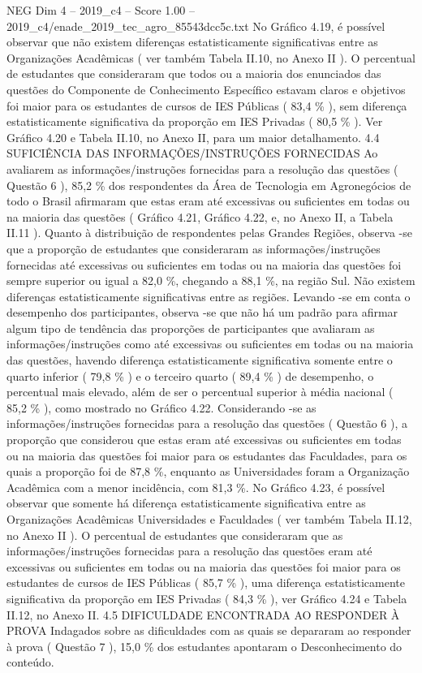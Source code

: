 \begin{textsample}{NEG Dim 4 – 2019\_c4 – Score 1.00 – 2019\_c4/enade\_2019\_tec\_agro\_85543dcc5c.txt}
No Gráfico 4.19, é possível observar que não existem diferenças estatisticamente significativas entre as Organizações Acadêmicas ( ver também Tabela II.10, no Anexo II ).
O percentual de estudantes que consideraram que todos ou a maioria dos enunciados das questões do Componente de Conhecimento Específico estavam claros e objetivos foi maior para os estudantes de cursos de IES Públicas ( 83,4 \% ), sem diferença estatisticamente significativa da proporção em IES Privadas ( 80,5 \% ).
Ver Gráfico 4.20 e Tabela II.10, no Anexo II, para um maior detalhamento. 4.4 SUFICIÊNCIA DAS INFORMAÇÕES/INSTRUÇÕES FORNECIDAS Ao avaliarem as informações/instruções fornecidas para a resolução das questões ( Questão 6 ), 85,2 \% dos respondentes da Área de Tecnologia em Agronegócios de todo o Brasil afirmaram que estas eram até excessivas ou suficientes em todas ou na maioria das questões ( Gráfico 4.21, Gráfico 4.22, e, no Anexo II, a Tabela II.11 ).
Quanto à distribuição de respondentes pelas Grandes Regiões, observa -se que a proporção de estudantes que consideraram as informações/instruções fornecidas até excessivas ou suficientes em todas ou na maioria das questões foi sempre superior ou igual a 82,0 \%, chegando a 88,1 \%, na região Sul.
Não existem diferenças estatisticamente significativas entre as regiões.
Levando -se em conta o desempenho dos participantes, observa -se que não há um padrão para afirmar algum tipo de tendência das proporções de participantes que avaliaram as informações/instruções como até excessivas ou suficientes em todas ou na maioria das questões, havendo diferença estatisticamente significativa somente entre o quarto inferior ( 79,8 \% ) e o terceiro quarto ( 89,4 \% ) de desempenho, o percentual mais elevado, além de ser o percentual superior à média nacional ( 85,2 \% ), como mostrado no Gráfico 4.22.
Considerando -se as informações/instruções fornecidas para a resolução das questões ( Questão 6 ), a proporção que considerou que estas eram até excessivas ou suficientes em todas ou na maioria das questões foi maior para os estudantes das Faculdades, para os quais a proporção foi de 87,8 \%, enquanto as Universidades foram a Organização Acadêmica com a menor incidência, com 81,3 \%.
No Gráfico 4.23, é possível observar que somente há diferença estatisticamente significativa entre as Organizações Acadêmicas Universidades e Faculdades ( ver também Tabela II.12, no Anexo II ).
O percentual de estudantes que consideraram que as informações/instruções fornecidas para a resolução das questões eram até excessivas ou suficientes em todas ou na maioria das questões foi maior para os estudantes de cursos de IES Públicas ( 85,7 \% ), uma diferença estatisticamente significativa da proporção em IES Privadas ( 84,3 \% ), ver Gráfico 4.24 e Tabela II.12, no Anexo II. 4.5 DIFICULDADE ENCONTRADA AO RESPONDER À PROVA Indagados sobre as dificuldades com as quais se depararam ao responder à prova ( Questão 7 ), 15,0 \% dos estudantes apontaram o Desconhecimento do conteúdo.

\end{textsample}
